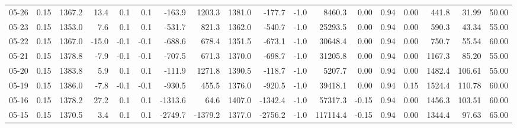 \begin{threeparttable}
{\begin{tabular}{lrrrrrrrrrrrrrrrrr}
  05-26 &     0.15 & 1367.2 &              13.4 &               0.1 &                0.1 &             -163.9 &  1203.3 & 1381.0 &     -177.7 &                     -1.0 &              8460.3 &       0.00 &      0.94 &           0.00 &            441.8 &           31.99 &                  50.00 \\
  05-23 &     0.15 & 1353.0 &               7.6 &               0.1 &                0.1 &             -531.7 &   821.3 & 1362.0 &     -540.7 &                     -1.0 &             25293.5 &       0.00 &      0.94 &           0.00 &            590.3 &           43.34 &                  55.00 \\
  05-22 &     0.15 & 1367.0 &             -15.0 &              -0.1 &               -0.1 &             -688.6 &   678.4 & 1351.5 &     -673.1 &                     -1.0 &             30648.4 &       0.00 &      0.94 &           0.00 &            750.7 &           55.54 &                  60.00 \\
  05-21 &     0.15 & 1378.8 &              -7.9 &              -0.1 &               -0.1 &             -707.5 &   671.3 & 1370.0 &     -698.7 &                     -1.0 &             31205.8 &       0.00 &      0.94 &           0.00 &           1167.3 &           85.20 &                  55.00 \\
  05-20 &     0.15 & 1383.8 &               5.9 &               0.1 &                0.1 &             -111.9 &  1271.8 & 1390.5 &     -118.7 &                     -1.0 &              5207.7 &       0.00 &      0.94 &           0.00 &           1482.4 &          106.61 &                  55.00 \\
  05-19 &     0.15 & 1386.0 &              -7.8 &              -0.1 &               -0.1 &             -930.5 &   455.5 & 1376.0 &     -920.5 &                     -1.0 &             39418.1 &       0.00 &      0.94 &           0.15 &           1524.4 &          110.78 &                  60.00 \\
  05-16 &     0.15 & 1378.2 &              27.2 &               0.1 &                0.1 &            -1313.6 &    64.6 & 1407.0 &    -1342.4 &                     -1.0 &             57317.3 &      -0.15 &      0.94 &           0.00 &           1456.3 &          103.51 &                  60.00 \\
  05-15 &     0.15 & 1370.5 &               3.4 &               0.1 &                0.1 &            -2749.7 & -1379.2 & 1377.0 &    -2756.2 &                     -1.0 &            117114.4 &      -0.15 &      0.94 &           0.00 &           1344.4 &           97.63 &                  65.00 \\

\end{tabular}}
\end{threeparttable}
